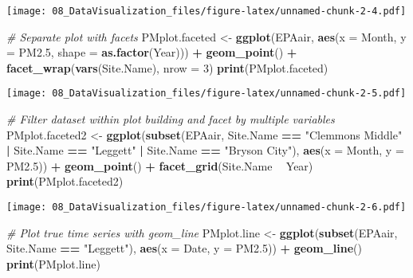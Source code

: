 \documentclass[
]{article}
\newenvironment{Shaded}{\begin{snugshade}}{\end{snugshade}}
\newcommand{\CommentTok}[1]{\textcolor[rgb]{0.56,0.35,0.01}{\textit{#1}}}
\newcommand{\DataTypeTok}[1]{\textcolor[rgb]{0.13,0.29,0.53}{#1}}
\newcommand{\DecValTok}[1]{\textcolor[rgb]{0.00,0.00,0.81}{#1}}
\newcommand{\FloatTok}[1]{\textcolor[rgb]{0.00,0.00,0.81}{#1}}
\newcommand{\KeywordTok}[1]{\textcolor[rgb]{0.13,0.29,0.53}{\textbf{#1}}}
\newcommand{\NormalTok}[1]{#1}
\newcommand{\OperatorTok}[1]{\textcolor[rgb]{0.81,0.36,0.00}{\textbf{#1}}}
\newcommand{\StringTok}[1]{\textcolor[rgb]{0.31,0.60,0.02}{#1}}
\begin{document}
\texttt{[image: 08\_DataVisualization\_files/figure-latex/unnamed-chunk-2-4.pdf]}

\begin{Shaded}
\begin{Highlighting}[]
\CommentTok{# Separate plot with facets}
\NormalTok{PMplot.faceted <-}
\StringTok{  }\KeywordTok{ggplot}\NormalTok{(EPAair, }\KeywordTok{aes}\NormalTok{(}\DataTypeTok{x =}\NormalTok{ Month, }\DataTypeTok{y =}\NormalTok{ PM2}\FloatTok{.5}\NormalTok{, }\DataTypeTok{shape =} \KeywordTok{as.factor}\NormalTok{(Year))) }\OperatorTok{+}
\StringTok{  }\KeywordTok{geom_point}\NormalTok{() }\OperatorTok{+}
\StringTok{  }\KeywordTok{facet_wrap}\NormalTok{(}\KeywordTok{vars}\NormalTok{(Site.Name), }\DataTypeTok{nrow =} \DecValTok{3}\NormalTok{)}
\KeywordTok{print}\NormalTok{(PMplot.faceted)}
\end{Highlighting}
\end{Shaded}

\texttt{[image: 08\_DataVisualization\_files/figure-latex/unnamed-chunk-2-5.pdf]}

\begin{Shaded}
\begin{Highlighting}[]
\CommentTok{# Filter dataset within plot building and facet by multiple variables}
\NormalTok{PMplot.faceted2 <-}\StringTok{ }
\StringTok{  }\KeywordTok{ggplot}\NormalTok{(}\KeywordTok{subset}\NormalTok{(EPAair, Site.Name }\OperatorTok{==}\StringTok{ "Clemmons Middle"} \OperatorTok{|}\StringTok{ }\NormalTok{Site.Name }\OperatorTok{==}\StringTok{ "Leggett"} \OperatorTok{|}
\StringTok{                  }\NormalTok{Site.Name }\OperatorTok{==}\StringTok{ "Bryson City"}\NormalTok{), }
         \KeywordTok{aes}\NormalTok{(}\DataTypeTok{x =}\NormalTok{ Month, }\DataTypeTok{y =}\NormalTok{ PM2}\FloatTok{.5}\NormalTok{)) }\OperatorTok{+}\StringTok{ }
\StringTok{  }\KeywordTok{geom_point}\NormalTok{() }\OperatorTok{+}
\StringTok{  }\KeywordTok{facet_grid}\NormalTok{(Site.Name }\OperatorTok{~}\StringTok{ }\NormalTok{Year) }
\KeywordTok{print}\NormalTok{(PMplot.faceted2)}
\end{Highlighting}
\end{Shaded}

\texttt{[image: 08\_DataVisualization\_files/figure-latex/unnamed-chunk-2-6.pdf]}

\begin{Shaded}
\begin{Highlighting}[]
\CommentTok{# Plot true time series with geom_line}
\NormalTok{PMplot.line <-}\StringTok{ }
\StringTok{  }\KeywordTok{ggplot}\NormalTok{(}\KeywordTok{subset}\NormalTok{(EPAair, Site.Name }\OperatorTok{==}\StringTok{ "Leggett"}\NormalTok{), }
         \KeywordTok{aes}\NormalTok{(}\DataTypeTok{x =}\NormalTok{ Date, }\DataTypeTok{y =}\NormalTok{ PM2}\FloatTok{.5}\NormalTok{)) }\OperatorTok{+}
\StringTok{  }\KeywordTok{geom_line}\NormalTok{()}
\KeywordTok{print}\NormalTok{(PMplot.line)}
\end{Highlighting}
\end{Shaded}
\end{document}
